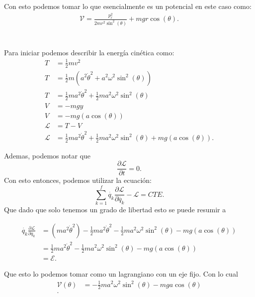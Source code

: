 \documentclass{report}
\begin{document}
Con esto podemos tomar lo que esencialmente es un potencial en este caso como:
\begin{align*}
  \mathcal{V} = \frac{p_\ell^{2}}{2mr^2\sin^2\left( \theta \right) } + mgr\cos\left( \theta \right)
.\end{align*}

\chapter{}

Para iniciar podemos describir la energía cinética como:
\begin{align*}
  T &= \frac{1}{2}mv^2 \\
  T &= \frac{1}{2}m\left( a^2\dot{\theta}^2 + a^2\omega^2 \sin^2\left( \theta \right)  \right)  \\
  T &= \frac{1}{2}ma^2\dot{\theta}^2 + \frac{1}{2}ma^2\omega^2\sin^2\left( \theta \right)  \\
  V &= -mgy\\
  V &= -mg\left( a \cos\left( \theta \right)  \right)  \\
  \mathcal{L} &= T - V \\
  \mathcal{L} &= \frac{1}{2}ma^2\dot{\theta}^2 + \frac{1}{2}ma^2\omega^2\sin^2\left( \theta \right) + mg\left( a \cos\left( \theta \right) \right) 
.\end{align*}

Ademas, podemos notar que \[
  \frac{\partial \mathcal{L}}{\partial t}  = 0
.\] Con esto entonces, podemos utilizar la ecuación: \[
\sum_{k=1}^{f} \dot{q_k}\frac{\partial \mathcal{L}}{\partial \dot{q_k}} - \mathcal{L} = CTE
.\] Que dado que solo tenemos un grado de libertad esto se puede resumir a

\begin{align*}
  \dot{q_k}\frac{\partial \mathcal{L}}{\partial \dot{q_k}} &= \left( ma^2\dot{\theta}^2 \right) -\frac{1}{2}ma^2\dot{\theta}^2 - \frac{1}{2}ma^2\omega^2\sin^2\left( \theta \right) - mg\left( a \cos\left( \theta \right) \right)   \\
  &= \frac{1}{2}ma^2\dot{\theta}^2 - \frac{1}{2}ma^2\omega^2\sin^2\left( \theta \right) - mg\left( a \cos\left( \theta \right) \right) \\
  &= \mathcal{E}
.\end{align*}

Que esto lo podemos tomar como un lagrangiano con un eje fijo. Con lo cual
\begin{align*}
  \mathcal{V}\left( \theta \right) &= -\frac{1}{2}ma^2\omega^2\sin^2\left( \theta \right) - mga\cos\left( \theta \right)  \\
.\end{align*}
\end{document}
